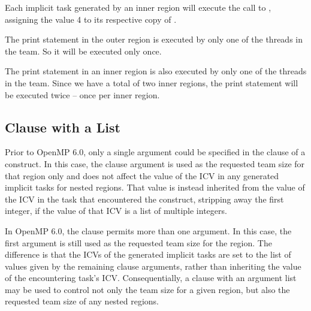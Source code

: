 Each implicit task generated by an inner  region will execute 
the call to , assigning the value 4 to its respective 
copy of .

The print statement in the outer  region is executed by only one 
of the threads in the team. So it will be executed only once.

The print statement in an inner  region is also executed by only 
one of the threads in the team. Since we have a total of two inner  
regions, the print statement will be executed twice -- once per inner  
region.

\pagebreak
{}


\pagebreak
\subsection{ Clause with a List}
\label{subsec:icv_nthreads}

Prior to OpenMP 6.0, only a single argument could be specified in the 
 clause of a  construct. 
In this case, the clause argument is used as the requested team size for 
that  region only and does not affect the value of the
 ICV in any generated implicit tasks for nested 
 regions.
That value is instead inherited from the value of the  
ICV in the task that encountered the  construct, 
stripping away the first integer, if the value of that ICV is a list of 
multiple integers. 

In OpenMP 6.0, the  clause permits more than one argument.
In this case, the first argument is still used as the requested team size for
the  region. The difference is that the  ICVs of
the generated implicit tasks are set to the list of values given by the
remaining clause arguments, rather than inheriting the value of the
encountering task's  ICV. Consequentially, a
 clause with an argument list may be used to control not
only the team size for a given  region, but also the 
requested team size of any nested  regions.

